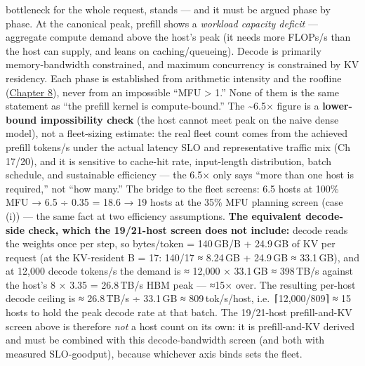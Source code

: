 bottleneck for the whole request, stands --- and it must be argued phase
by phase. At the canonical peak, prefill shows a \emph{workload capacity
deficit} --- aggregate compute demand above the host's peak (it needs
more FLOPs/s than the host can supply, and leans on caching/queueing).
Decode is primarily memory-bandwidth constrained, and maximum
concurrency is constrained by KV residency. Each phase is established
from arithmetic intensity and the roofline (\hyperref[chap:8]{Chapter 8}), never from an
impossible ``MFU \textgreater{} 1.'' None of them is the same statement
as ``the prefill kernel is compute-bound.'' The \textasciitilde6.5×
figure is a \textbf{lower-bound impossibility check} (the host cannot
meet peak on the naive dense model), not a fleet-sizing estimate: the
real fleet count comes from the achieved prefill tokens/s under the
actual latency SLO and representative traffic mix (Ch 17/20), and it is
sensitive to cache-hit rate, input-length distribution, batch schedule,
and sustainable efficiency --- the 6.5× only says ``more than one host
is required,'' not ``how many.'' The bridge to the fleet screens: 6.5
hosts at 100\% MFU → 6.5 ÷ 0.35 = 18.6 → 19 hosts at the 35\% MFU
planning screen (case (i)) --- the same fact at two efficiency
assumptions. \textbf{The equivalent decode-side check, which the
19/21-host screen does not include:} decode reads the weights once per
step, so bytes/token = 140\,GB/B + 24.9\,GB of KV per request (at the
KV-resident B = 17: 140/17 ≈ 8.24\,GB + 24.9\,GB ≈ 33.1\,GB), and at
12,000 decode tokens/s the demand is ≈ 12,000 × 33.1\,GB ≈ 398\,TB/s
against the host's 8 × 3.35 = 26.8\,TB/s HBM peak --- ≈15× over. The
resulting per-host decode ceiling is ≈ 26.8\,TB/s ÷ 33.1\,GB ≈
809\,tok/s/host, i.e.~⌈12,000/809⌉ ≈ 15 hosts to hold the peak decode
rate at that batch. The 19/21-host prefill-and-KV screen above is
therefore \emph{not} a host count on its own: it is prefill-and-KV
derived and must be combined with this decode-bandwidth screen (and both
with measured SLO-goodput), because whichever axis binds sets the fleet.

